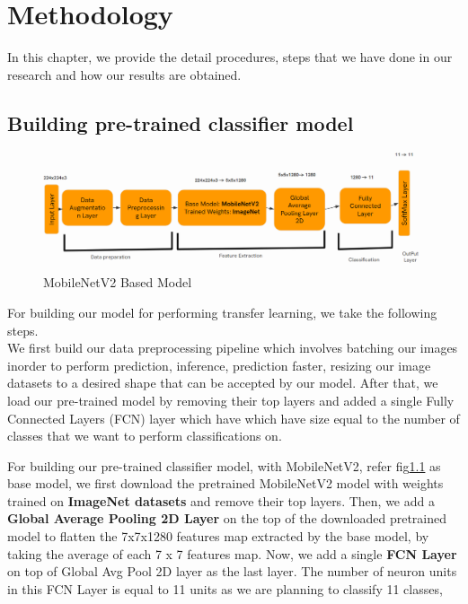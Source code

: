 \chapter{Methodology}

In this chapter, we provide the detail procedures, steps that we have done in our research and how our results are obtained.\par\vspace{1em}


\section{Building pre-trained classifier model}
\begin{figure}
    \centering
    \includegraphics[width=1\linewidth]{graphics/chapter5/mobileNetV2 base model.png}
    \caption{MobileNetV2 Based Model}
    \label{fig:mobilenetv2-based-model}
\end{figure}

For building our model for performing transfer learning, we take the following steps.\\
We first build our data preprocessing pipeline which involves batching our images inorder to perform prediction, inference, prediction faster, resizing our image datasets to a desired shape that can be accepted by our model. After that, we load our pre-trained model by removing their top layers and added a single Fully Connected Layers (FCN) layer which have which have size equal to the number of classes that we want to perform classifications on.\par\vspace{1em}

For building our pre-trained classifier model, with MobileNetV2, refer fig\ref{fig:mobilenetv2-based-model} as base model, we first download the pretrained MobileNetV2 model with weights trained on \textbf{ImageNet datasets} and remove their top layers. Then, we add a \textbf{Global Average Pooling 2D Layer} on the top of the downloaded pretrained model to flatten the  7x7x1280 features map extracted by the base model, by taking the average of each 7 x 7 features map. Now, we add a single \textbf{FCN Layer} on top of Global Avg Pool 2D layer as the last layer. The number of neuron units in this FCN Layer is equal to 11 units as we are planning to classify 11 classes,\par\vspace{1em}

